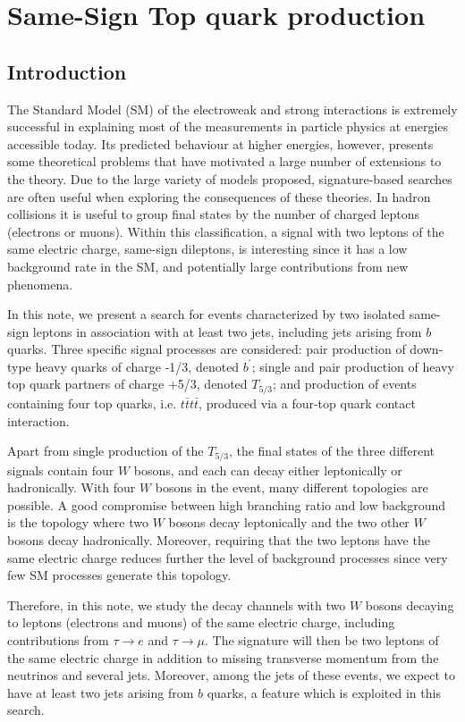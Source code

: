 
\section{Same-Sign Top quark production}

\subsection{Introduction}
The Standard Model (SM) of the electroweak and strong interactions is extremely successful in
explaining most of the measurements in particle physics at energies accessible today. Its
predicted behaviour at higher energies, however, presents some theoretical problems that
have motivated a large number of extensions to the theory. Due to the large
variety of models proposed, signature-based searches are often useful when exploring the
consequences of these theories. In hadron collisions it is useful to
group final states by the number of charged leptons (electrons or muons). Within this
classification, a signal with two leptons of the same electric charge, same-sign
dileptons, is interesting since it has a low background rate in the SM, and
potentially large contributions from new phenomena.

In this note, we present a search for events characterized by two isolated same-sign leptons
in association with at least two jets, including jets arising from $b$ quarks. Three specific signal
processes are considered: pair production of down-type heavy quarks of charge -1/3, denoted $b^\prime$;
single and pair production of heavy top quark partners of charge +5/3, denoted $T_{5/3}$; and
production of events containing four top quarks, i.e. $t\bar{t}t\bar{t}$, 
produced via a four-top quark contact interaction.

Apart from single production of the $T_{5/3}$, the final states of the three different
signals contain four $W$ bosons, and each can decay either leptonically or hadronically. 
With four $W$ bosons in the event, many different topologies are possible. A good compromise between
high branching ratio and low background is the topology where two $W$ bosons decay leptonically
and the two other $W$ bosons decay hadronically. Moreover, requiring that the two leptons have the same
electric charge reduces further the level of background processes since very few SM processes 
generate this topology. 

Therefore, in this note, we study the decay channels with two $W$ bosons decaying to leptons (electrons
and muons) of the same electric charge, including contributions from $\tau\rightarrow e$ and
$\tau\rightarrow\mu$. 
The signature will then be two leptons of the same electric charge in addition to missing 
transverse momentum from the neutrinos and several jets. Moreover, among the jets 
of these events, we expect to have at least two jets arising from $b$ quarks, a feature which is
exploited in this search.

